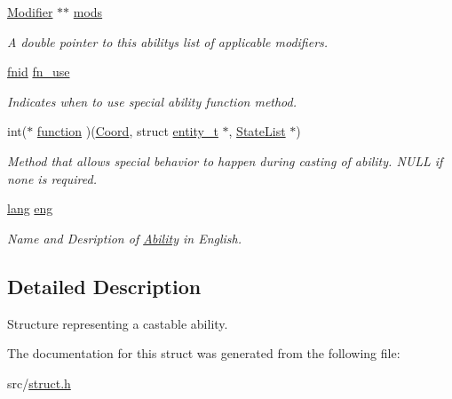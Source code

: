 \begin{DoxyCompactItemize}
\mbox{\label{struct_ability_a9b238ea0483f5db1bc952e0b79f86aac}} 
\hyperlink{struct_modifier}{Modifier} $\ast$$\ast$ \hyperlink{struct_ability_a9b238ea0483f5db1bc952e0b79f86aac}{mods}
\begin{DoxyCompactList}\small\item\em A double pointer to this ability\textquotesingle{}s list of applicable modifiers. \end{DoxyCompactList}\item 
\mbox{\label{struct_ability_ac8a0a86236da7622bf3fd6f4a9cb06bb}} 
\hyperlink{substruct_8h_aca32bbff6b66718eb538b2bfef2b5354}{fnid} \hyperlink{struct_ability_ac8a0a86236da7622bf3fd6f4a9cb06bb}{fn\+\_\+use}
\begin{DoxyCompactList}\small\item\em Indicates when to use special ability function method. \end{DoxyCompactList}\item 
\mbox{\label{struct_ability_a0ef8d4d8ff07c99977d7bacddb55a0b3}} 
int($\ast$ \hyperlink{struct_ability_a0ef8d4d8ff07c99977d7bacddb55a0b3}{function} )(\hyperlink{struct_coord}{Coord}, struct \hyperlink{structentity__t}{entity\+\_\+t} $\ast$, \hyperlink{struct_state_list}{State\+List} $\ast$)
\begin{DoxyCompactList}\small\item\em Method that allows special behavior to happen during casting of ability. N\+U\+LL if none is required. \end{DoxyCompactList}\item 
\mbox{\label{struct_ability_a166660a51a7b59c47ff4ef2ad5f30258}} 
\hyperlink{structlang}{lang} \hyperlink{struct_ability_a166660a51a7b59c47ff4ef2ad5f30258}{eng}
\begin{DoxyCompactList}\small\item\em Name and Desription of \hyperlink{struct_ability}{Ability} in English. \end{DoxyCompactList}\end{DoxyCompactItemize}


\subsection{Detailed Description}
Structure representing a castable ability. 

The documentation for this struct was generated from the following file\+:\begin{DoxyCompactItemize}
\item 
src/\hyperlink{struct_8h}{struct.\+h}\end{DoxyCompactItemize}
